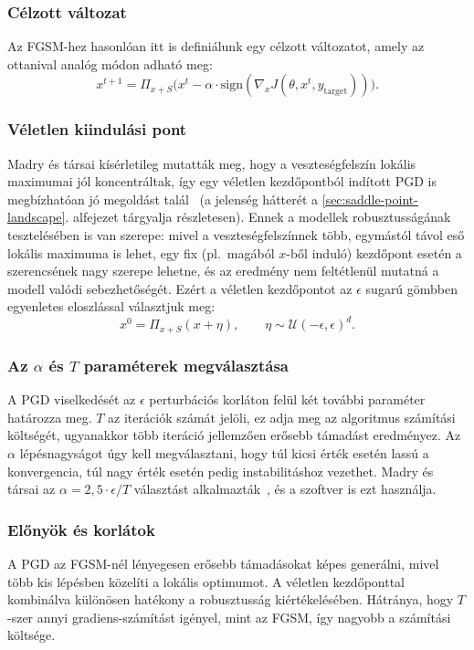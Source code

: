 \subsubsection{Célzott változat}
Az FGSM-hez hasonlóan itt is definiálunk egy célzott változatot, amely az ottanival analóg módon adható meg: 
\[
  x^{t+1} = \Pi_{x+S}\big(x^t - \alpha \cdot \mathrm{sign}(\nabla_x J(\theta, x^t, y_{\mathrm{target}}))\big).
\]

\subsubsection{Véletlen kiindulási pont}
Madry és társai kísérletileg mutatták meg, hogy a veszteségfelszín lokális maximumai jól koncentráltak, így egy véletlen 
kezdőpontból indított PGD is megbízhatóan jó megoldást talál~\cite{madry2018towards} (a jelenség hátterét a 
\ref{sec:saddle-point-landscape}. alfejezet tárgyalja részletesen). 
Ennek a modellek robusztusságának tesztelésében is van szerepe: mivel a veszteségfelszínnek több, egymástól távol eső lokális 
maximuma is lehet, egy fix (pl.\ magából $x$-ből induló) kezdőpont esetén a szerencsének nagy szerepe lehetne, és az eredmény 
nem feltétlenül mutatná a modell valódi sebezhetőségét. 
Ezért a véletlen kezdőpontot az $\epsilon$ sugarú gömbben egyenletes eloszlással választjuk meg: 
\[
  x^0 = \Pi_{x+S}(x + \eta), \qquad \eta \sim \mathcal{U}(-\epsilon, \epsilon)^d.
\]

\subsubsection{Az $\alpha$ és $T$ paraméterek megválasztása}
A PGD viselkedését az $\epsilon$ perturbációs korláton felül két további paraméter határozza meg. 
$T$ az iterációk számát jelöli, ez adja meg az algoritmus számítási költségét, ugyanakkor több iteráció jellemzően erősebb 
támadást eredményez. 
Az $\alpha$ lépésnagyságot úgy kell megválasztani, hogy túl kicsi érték esetén lassú a konvergencia, túl nagy érték esetén pedig 
instabilitáshoz vezethet. 
Madry és társai az $\alpha = 2{,}5 \cdot \epsilon / T$ választást alkalmazták~\cite{madry2018towards}, és a szoftver is ezt használja. 

\subsubsection{Előnyök és korlátok}
A PGD az FGSM-nél lényegesen erősebb támadásokat képes generálni, mivel több kis lépésben közelíti a lokális optimumot. 
A véletlen kezdőponttal kombinálva különösen hatékony a robusztusság kiértékelésében. 
Hátránya, hogy $T$-szer annyi gradiens-számítást igényel, mint az FGSM, így nagyobb a számítási költsége. 

